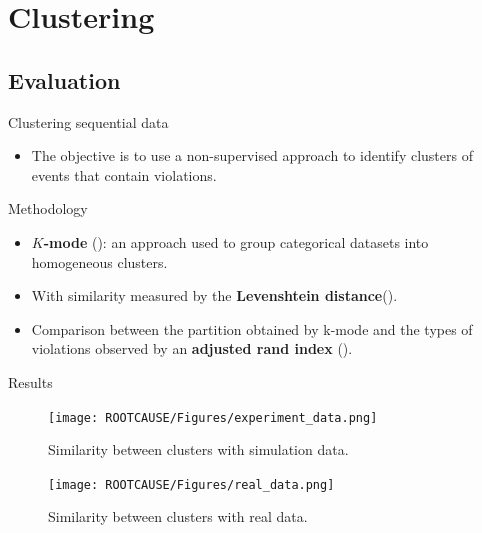 \documentclass{beamer}
\begin{document}
\section{Clustering}
\subsection{Evaluation}
\begin{frame} %
\begin{block}{Clustering sequential data}
\begin{itemize}
\item The objective is to use a non-supervised approach to identify clusters of events that contain violations.
\end{itemize}
\end{block}

\begin{block}{Methodology}
\begin{itemize}
\item \textbf{$K$-mode} (\cite{mastrogiannis2009cl}): an approach used to group categorical datasets into homogeneous clusters.
\item With similarity measured by the \textbf{Levenshtein distance}(\cite{yujian2007normalized}).
\item Comparison between the partition obtained by k-mode and the types of violations observed by an \textbf{adjusted rand index} (\cite{steinley2004properties}).
\end{itemize}
\end{block}
\end{frame}

\begin{frame}{Results}

\begin{minipage}[t]{0.5\linewidth}
\begin{figure}[ht]
        \texttt{[image: ROOTCAUSE/Figures/experiment\_data.png]}
        \caption{Similarity between clusters with simulation data.}
        \label{fig:my_label}
\end{figure}
\end{minipage}\hfill
\begin{minipage}[t]{0.5\linewidth}
\begin{figure}[ht]
        \texttt{[image: ROOTCAUSE/Figures/real\_data.png]}
        \caption{Similarity between clusters with real data.}
        \label{fig:my_label}
\end{figure}
\vspace{-0.5cm}
\begin{itemize}
\end{itemize}

\end{minipage}

\end{frame}
\end{document}
